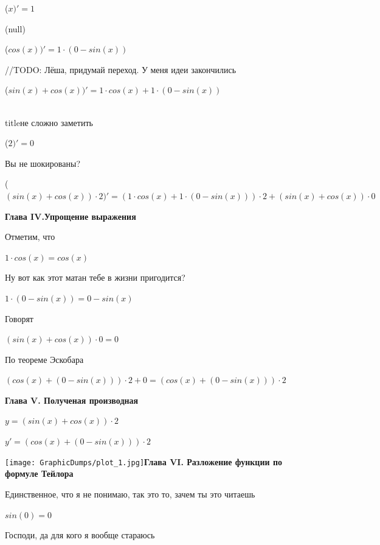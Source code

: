 \documentclass[12pt,a4paper,fleqn]{article}
\begin{document}
\begin{center}
 ($x)'
  = 1$\end{center}
(null)\cite{link4}

\begin{center}
 ($cos(x))'
  = 1 \cdot (0-sin(x))$\end{center}
//TODO: Лёша, придумай переход. У меня идеи закончились

\begin{center}
 ($sin(x)+cos(x))'
  = 1 \cdot cos(x)+1 \cdot (0-sin(x))$\end{center}
\\ title{не сложно заметить} 

\begin{center}
 ($2)'
  = 0$\end{center}
Вы не шокированы?\cite{link3}

\begin{center}
 ($(sin(x)+cos(x)) \cdot 2)'
  = (1 \cdot cos(x)+1 \cdot (0-sin(x))) \cdot 2+(sin(x)+cos(x)) \cdot 0$\end{center}
\newpage \textbf{\LARGE{Глава IV.Упрощение выражения}}

Отметим, что

\begin{center}
$1 \cdot cos(x) = cos(x)$\end{center}
Ну вот как этот матан тебе в жизни пригодится?

\begin{center}
$1 \cdot (0-sin(x)) = 0-sin(x)$\end{center}
Говорят

\begin{center}
$(sin(x)+cos(x)) \cdot 0 = 0$\end{center}
По теореме Эскобара

\begin{center}
$(cos(x)+(0-sin(x))) \cdot 2+0 = (cos(x)+(0-sin(x))) \cdot 2$\end{center}
\newpage \textbf{\LARGE{Глава V. Полученая производная}}

$y = $$(sin(x)+cos(x)) \cdot 2$

$y' = $$(cos(x)+(0-sin(x))) \cdot 2$

\texttt{[image: GraphicDumps/plot\_1.jpg]}\newpage \textbf{\LARGE{Глава VI. Разложение функции по формуле Тейлора}}

Единственное, что я не понимаю, так это то, зачем ты это читаешь

\begin{center}
\end{center}
\begin{center}$sin(0) = 0$\end{center}
Господи, да для кого я вообще стараюсь
\end{document}
